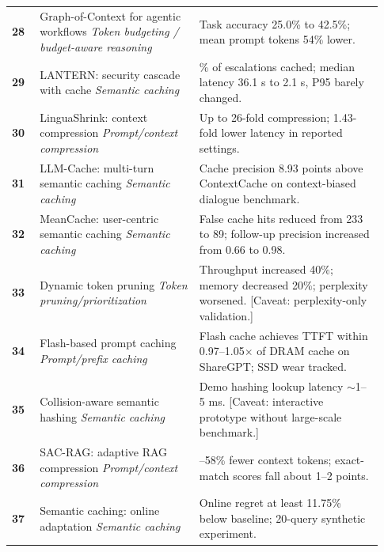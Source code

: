 \IfFileExists{jair.cls}{\documentclass{jair}}{\documentclass[manuscript,nonacm,screen]{acmart}}
\begin{document}
{\begin{longtable}{@{}>{\RaggedRight\arraybackslash}p{0.07\linewidth} >{\RaggedRight\arraybackslash}p{0.40\linewidth} >{\RaggedRight\arraybackslash}p{0.46\linewidth}@{}}
\textbf{28} & Graph-of-Context for agentic workflows \cite{S28}\newline\emph{Token budgeting / budget-aware reasoning} & Task accuracy 25.0\% to 42.5\%; mean prompt tokens 54\% lower. \\
\textbf{29} & LANTERN: security cascade with cache \cite{S29}\newline\emph{Semantic caching} & 64.8\% of escalations cached; median latency 36.1 s to 2.1 s, P95 barely changed. \\
\textbf{30} & LinguaShrink: context compression \cite{S30}\newline\emph{Prompt/context compression} & Up to 26-fold compression; 1.43-fold lower latency in reported settings. \\
\textbf{31} & LLM-Cache: multi-turn semantic caching \cite{S31}\newline\emph{Semantic caching} & Cache precision 8.93 points above ContextCache on context-biased dialogue benchmark. \\
\textbf{32} & MeanCache: user-centric semantic caching \cite{S32}\newline\emph{Semantic caching} & False cache hits reduced from 233 to 89; follow-up precision increased from 0.66 to 0.98. \\
\textbf{33} & Dynamic token pruning \cite{S33}\newline\emph{Token pruning/prioritization} & Throughput increased 40\%; memory decreased 20\%; perplexity worsened. [Caveat: perplexity-only validation.] \\
\textbf{34} & Flash-based prompt caching \cite{S34}\newline\emph{Prompt/prefix caching} & Flash cache achieves TTFT within 0.97--1.05$\times$ of DRAM cache on ShareGPT; SSD wear tracked. \\
\textbf{35} & Collision-aware semantic hashing \cite{S35}\newline\emph{Semantic caching} & Demo hashing lookup latency $\sim$1--5 ms. [Caveat: interactive prototype without large-scale benchmark.] \\
\textbf{36} & SAC-RAG: adaptive RAG compression \cite{S36}\newline\emph{Prompt/context compression} & 38--58\% fewer context tokens; exact-match scores fall about 1--2 points. \\
\textbf{37} & Semantic caching: online adaptation \cite{S37}\newline\emph{Semantic caching} & Online regret at least 11.75\% below baseline; 20-query synthetic experiment. \\

\end{longtable}}
\end{document}
